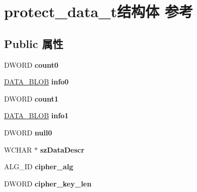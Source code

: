 \hypertarget{structprotect__data__t}{}\section{protect\+\_\+data\+\_\+t结构体 参考}
\label{structprotect__data__t}
\subsection*{Public 属性}
\begin{DoxyCompactItemize}
\item 
\mbox{\label{structprotect__data__t_aa355f2ae5ecab9fc9ee4c09fadc47510}} 
D\+W\+O\+RD {\bfseries count0}
\item 
\mbox{\label{structprotect__data__t_a308c04df82e5d068bc8b7b97709359dd}} 
\hyperlink{struct___c_r_y_p_t_o_a_p_i___b_l_o_b}{D\+A\+T\+A\+\_\+\+B\+L\+OB} {\bfseries info0}
\item 
\mbox{\label{structprotect__data__t_a84cb0d6876d2960f9332c66896abb99b}} 
D\+W\+O\+RD {\bfseries count1}
\item 
\mbox{\label{structprotect__data__t_a4767f2b5f53d6d46a6300c4a94a6bdc1}} 
\hyperlink{struct___c_r_y_p_t_o_a_p_i___b_l_o_b}{D\+A\+T\+A\+\_\+\+B\+L\+OB} {\bfseries info1}
\item 
\mbox{\label{structprotect__data__t_a2bf91c85a57563aff99f28dd2095f2ff}} 
D\+W\+O\+RD {\bfseries null0}
\item 
\mbox{\label{structprotect__data__t_a47de29e773948353641739709f392952}} 
W\+C\+H\+AR $\ast$ {\bfseries sz\+Data\+Descr}
\item 
\mbox{\label{structprotect__data__t_a5c052482d51ed6a016446a6c97411e57}} 
A\+L\+G\+\_\+\+ID {\bfseries cipher\+\_\+alg}
\item 
\mbox{\label{structprotect__data__t_a9b442635b60ec1c79668aa554129a7bf}} 
D\+W\+O\+RD {\bfseries cipher\+\_\+key\+\_\+len}
\item 
\mbox{\label{structprotect__data__t_a0c52198d87bd0ba699f957342f7692fe}} 

\end{DoxyCompactItemize}
